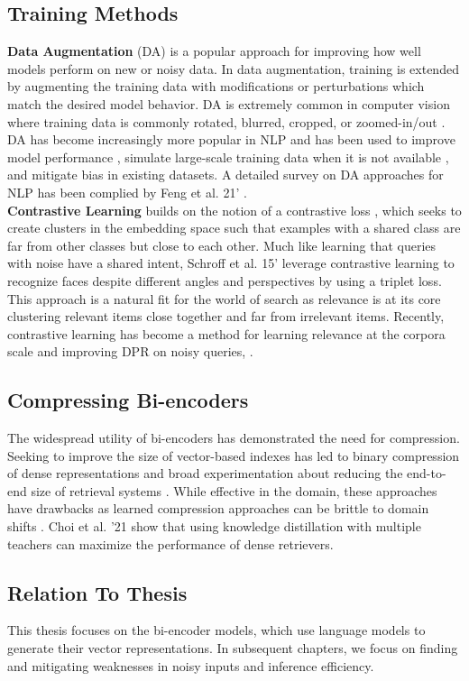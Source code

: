 \subsection{Training Methods}
\textbf{Data Augmentation} (DA) is a popular approach for improving how well models perform on new or noisy data. In data augmentation, training is extended by augmenting the training data with modifications or perturbations which match the desired model behavior. DA is extremely common in computer vision where training data is commonly rotated, blurred, cropped, or zoomed-in/out \cite{Mikoajczyk2018DataAF} \cite{Zhong2020RandomED}. DA has become increasingly more popular in NLP and has been used to improve model performance \cite{Jiao2020TinyBERTDB}, simulate large-scale training data when it is not available \cite{Li2020ADD}, and mitigate bias \cite{Lu2020GenderBI} in existing datasets. A detailed survey on DA approaches for NLP has been complied by Feng et al. 21' \cite{Feng2021ASO}.\\
\textbf{Contrastive Learning} builds on the notion of a contrastive loss \cite{Chopra2005LearningAS}, which seeks to create clusters in the embedding space such that examples with a shared class are far from other classes but close to each other. Much like learning that queries with noise have a shared intent, Schroff et al. 15' leverage contrastive learning to recognize faces despite different angles and perspectives \cite{Schroff2015FaceNetAU} by using a triplet loss. This approach is a natural fit for the world of search as relevance is at its core clustering relevant items close together and far from irrelevant items. Recently, contrastive learning has become a method for learning relevance at the corpora scale \cite{Xiong2021ApproximateNN} and improving DPR on noisy queries, \cite{Sidiropoulos2022AnalysingTR}.
\subsection{Compressing Bi-encoders}
The widespread utility of bi-encoders has demonstrated the need for compression. 
Seeking to improve the size of vector-based indexes has led to binary compression of dense representations \cite{Yamada2021EfficientPR} and broad experimentation about reducing the end-to-end size of retrieval systems \cite{Min2020NeurIPS2E}. While effective in the domain, these approaches have drawbacks as learned compression approaches can be brittle to domain shifts \cite{Thakur2022DomainAF}. Choi et al. '21 \cite{Choi2021ImprovingBD} show that using knowledge distillation with multiple teachers can maximize the performance of dense retrievers. 
\subsection{Relation To Thesis}
This thesis focuses on the bi-encoder models, which use language models to generate their vector representations. In subsequent chapters, we focus on finding and mitigating weaknesses in noisy inputs and inference efficiency. 
